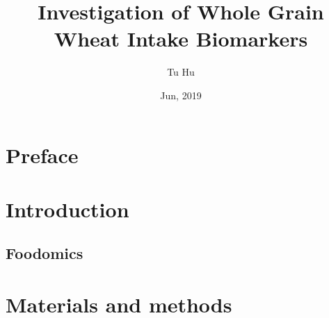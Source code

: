 \documentclass[]{article}
\title{Investigation of Whole Grain Wheat Intake Biomarkers}
\author{Tu Hu}
\subtitle{}
\date{Jun, 2019}
\begin{document}
\maketitle


\tableofcontents

\newpage
\section{Preface}


\section{Introduction}
\subsection{Foodomics}

\section{Materials and methods}

\end{document}
